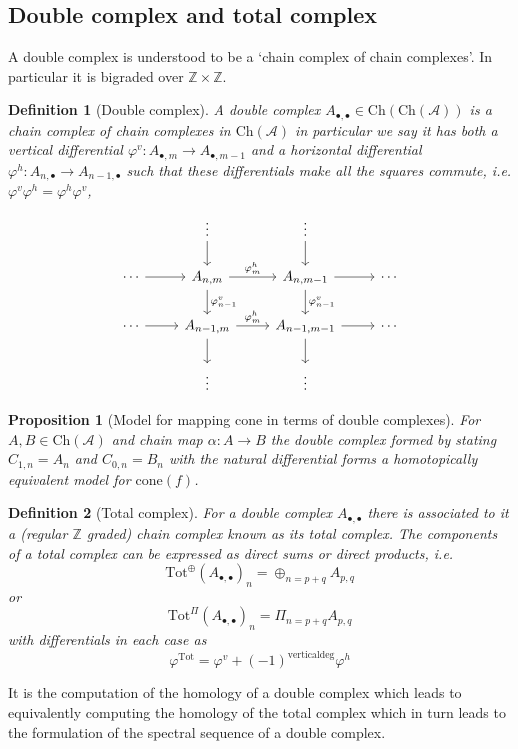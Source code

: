\documentclass[12pt]{article}
\numberwithin{equation}{section}
\newcommand{\Z}{\mathbb{Z}}
\newtheorem{definition}{Definition}[section]
\newtheorem{proposition}{Proposition}[section]
\begin{document}
	\subsection{Double complex and total complex}
	A double complex is understood to be a `chain complex of chain complexes'. In particular it is bigraded over $\Z \times \Z$.
	\begin{definition}[Double complex]
		A double complex $A_{\bullet, \bullet}\in \mathrm{Ch}(\mathrm{Ch}(\mathcal{A}))$ is a chain complex of chain complexes in $\mathrm{Ch}(\mathcal{A})$ in particular we say it has both a vertical differential $\varphi^v: A_{\bullet, m}\to A_{\bullet, m-1} $ and a horizontal differential $\varphi^h: A_{n, \bullet} \to A_{n-1, \bullet}$  such that these differentials make all the squares commute, i.e. $\varphi^v \varphi^h=\varphi^h \varphi^v$,
		\[\begin{tikzcd}
			& \vdots & \vdots \\
			\cdots & {A_{n,m}} & {A_{n,m-1}} & \cdots \\
			\cdots & {A_{n-1,m}} & {A_{n-1,m-1}} & \cdots \\
			& \vdots & \vdots
			\arrow["{\varphi^h_{m}}", from=2-2, to=2-3]
			\arrow[from=2-3, to=2-4]
			\arrow[from=2-1, to=2-2]
			\arrow[from=1-2, to=2-2]
			\arrow[from=1-3, to=2-3]
			\arrow["{\varphi^v_{n-1}}", from=2-2, to=3-2]
			\arrow["{\varphi^v_{n-1}}", from=2-3, to=3-3]
			\arrow[from=3-2, to=4-2]
			\arrow[from=3-3, to=4-3]
			\arrow[from=3-1, to=3-2]
			\arrow["{\varphi^h_{m}}", from=3-2, to=3-3]
			\arrow[from=3-3, to=3-4]
		\end{tikzcd}\]
	\end{definition}
	\begin{proposition}[Model for mapping cone in terms of double complexes]
		For $A,B \in \mathrm{Ch}(\mathcal{A})$ and chain map $\alpha: A \to B$ the double complex formed by stating $C_{1,n}=A_n$ and $C_{0,n}=B_n$ with the natural differential forms a homotopically equivalent model for $\mathrm{cone}(f)$.
	\end{proposition}
	\begin{definition}[Total complex]
		For a double complex $A_{\bullet,\bullet}$ there is associated to it a (regular $\Z$ graded) chain complex known as its total complex. The components of a total complex can be expressed as direct sums or direct products, i.e.
		\[ \mathrm{Tot}^\oplus (A_{\bullet, \bullet})_n=\oplus_{n=p+q} A_{p,q} \]
		or
		\[ \mathrm{Tot}^\Pi (A_{\bullet, \bullet})_n=\Pi_{n=p+q} A_{p,q} \]
		with differentials in each case as 
		\[ \varphi^{\mathrm{Tot}}=\varphi^v+(-1)^{\mathrm{vertical deg}}\varphi^h \]
	\end{definition}
	It is the computation of the homology of a double complex which leads to equivalently computing the homology of the total complex which in turn leads to the formulation of the spectral sequence of a double complex.
	
\end{document}
